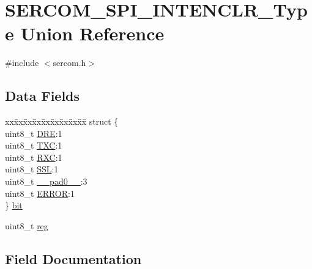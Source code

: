 \hypertarget{union_s_e_r_c_o_m___s_p_i___i_n_t_e_n_c_l_r___type}{}\section{S\+E\+R\+C\+O\+M\+\_\+\+S\+P\+I\+\_\+\+I\+N\+T\+E\+N\+C\+L\+R\+\_\+\+Type Union Reference}
\label{union_s_e_r_c_o_m___s_p_i___i_n_t_e_n_c_l_r___type}


{\ttfamily \#include $<$sercom.\+h$>$}

\subsection*{Data Fields}
\begin{DoxyCompactItemize}
\item 
\begin{tabbing}
xx\=xx\=xx\=xx\=xx\=xx\=xx\=xx\=xx\=\kill
struct \{\\
\>uint8\_t \mbox{\hyperlink{union_s_e_r_c_o_m___s_p_i___i_n_t_e_n_c_l_r___type_a5e4bea925be1d5304d58110ecc60f14e}{DRE}}:1\\
\>uint8\_t \mbox{\hyperlink{union_s_e_r_c_o_m___s_p_i___i_n_t_e_n_c_l_r___type_a8f012b40a2f5cf52b14d448b314b5cec}{TXC}}:1\\
\>uint8\_t \mbox{\hyperlink{union_s_e_r_c_o_m___s_p_i___i_n_t_e_n_c_l_r___type_ad465929f0a73cbdc2d5ab6b210909039}{RXC}}:1\\
\>uint8\_t \mbox{\hyperlink{union_s_e_r_c_o_m___s_p_i___i_n_t_e_n_c_l_r___type_ac2a5326783ce5e9d294fabed8aba7d3f}{SSL}}:1\\
\>uint8\_t \mbox{\hyperlink{union_s_e_r_c_o_m___s_p_i___i_n_t_e_n_c_l_r___type_a8b4eebe79ded0459acec2f4950102ba3}{\_\_pad0\_\_}}:3\\
\>uint8\_t \mbox{\hyperlink{union_s_e_r_c_o_m___s_p_i___i_n_t_e_n_c_l_r___type_a4be51829c8720b7d159b77c39924afaa}{ERROR}}:1\\
\} \mbox{\hyperlink{union_s_e_r_c_o_m___s_p_i___i_n_t_e_n_c_l_r___type_a51c1c5b17e0fe6e02c50518ddcbb3c67}{bit}}\\

\end{tabbing}\item 
uint8\+\_\+t \mbox{\hyperlink{union_s_e_r_c_o_m___s_p_i___i_n_t_e_n_c_l_r___type_a9428adc9af4653a2050e2536b55dec8d}{reg}}
\end{DoxyCompactItemize}


\subsection{Field Documentation}
\mbox{\label{union_s_e_r_c_o_m___s_p_i___i_n_t_e_n_c_l_r___type_a8b4eebe79ded0459acec2f4950102ba3}} 
